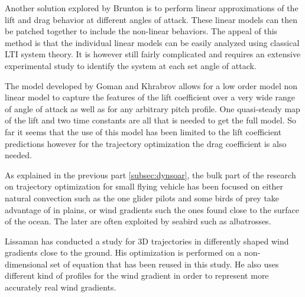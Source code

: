 \par Another solution explored by Brunton \cite{brunton2008unsteady} is to perform linear approximations of the lift and drag behavior at different angles of attack.
These linear models can then be patched together to include the non-linear behaviors.
The appeal of this method is that the individual linear models can be easily analyzed using classical LTI system theory.
It is however still fairly complicated and requires an extensive experimental study to identify the system at each set angle of attack.

\par The model developed by Goman and Khrabrov allows for a low order model non linear model to capture the features of the lift coefficient over a very wide range of angle of attack as well as for any arbitrary pitch profile.
One quasi-steady map of the lift and two time constants are all that is needed to get the full model.
So far it seems that the use of this model has been limited to the lift coefficient predictions however for the trajectory optimization the drag coefficient is also needed.


\par As explained in the previous part \ref{subsec:dynsoar}, the bulk part of the research on trajectory optimization for small flying vehicle has been focused on either natural convection such as the one glider pilots and some birds of prey take advantage of in plains, or wind gradients such the ones found close to the surface of the ocean.
The later are often exploited by seabird such as albatrosses.

\par Lissaman \cite{lissaman2005wind} has conducted a study for 3D trajectories in differently shaped wind gradients close to the ground.
His optimization is performed on a non-dimensional set of equation that has been reused in this study.
He also uses different kind of profiles for the wind gradient in order to represent more accurately real wind gradients.

